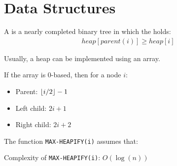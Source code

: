 \chapter{Data Structures}

    \par A  is a nearly completed binary tree in which the
       holds:
      \begin{align*}
        heap[parent(i)] \geq heap[i]
      \end{align*}
    \par Usually, a heap can be implemented using an array.
    \par If the array is 0-based, then for a node $i$:
    \begin{itemize}
      \item Parent: $\lfloor i / 2\rfloor - 1$
      \item Left child: $2i + 1$
      \item Right child: $2i + 2$
    \end{itemize}
    \par The function \texttt{MAX-HEAPIFY(i)} assumes that: 
    \par Complexity of \texttt{MAX-HEAPIFY(i)}: $O(\log(n))$
    \begin{algorithm}
      \begin{algorithmic}[1]
          \ENDIF
          \ENDIF
          \ENDIF
        \ENDFUNCTION
      \end{algorithmic}
    \end{algorithm}
    \begin{algorithm}[H]
      \begin{algorithmic}[1]
          \ENDFOR
        \ENDPROCEDURE
      \end{algorithmic}
    \end{algorithm}
